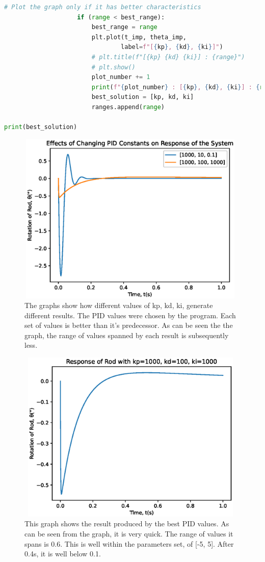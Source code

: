\documentclass[a4paper,10pt,reqno]{article}
\numberwithin{equation}{section}
\begin{document}
\begin{lstlisting}[language=Python]
                    # Plot the graph only if it has better characteristics
                    if (range < best_range):
                        best_range = range
                        plt.plot(t_imp, theta_imp,
                        		label=f"[{kp}, {kd}, {ki}]")
                        # plt.title(f"[{kp} {kd} {ki}] : {range}")
                        # plt.show()
                        plot_number += 1
                        print(f"{plot_number} : [{kp}, {kd}, {ki}] : {range}")
                        best_solution = [kp, kd, ki]
                        ranges.append(range)
                        
print(best_solution)
\end{lstlisting}

\begin{figure}[H]
\centering
\includegraphics[width=11cm, height=8.25cm]{Changing_PID_Constants.eps}
\caption
{The graphs show how different values of kp, kd, ki, generate different results. The PID values were chosen by the program. Each set of values is better than it's predecessor. As can be seen the the graph, the range of values spanned by each result is subsequently less.}
\end{figure}

\begin{figure}[H]
\centering
\includegraphics[width=11cm, height=8.25cm]{Best_Solution.eps}
\caption
{This graph shows the result produced by the best PID values. As can be seen from the graph, it is very quick. The range of values it spans is 0.6\degree. This is well within the parameters set, of [-5\degree, 5\degree]. After 0.4s, it is well below 0.1\degree. }
\end{figure}
\end{document}
